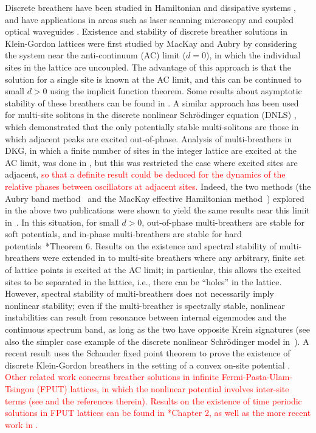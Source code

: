 \documentclass[12pt,reqno]{amsart}
\theoremstyle{definition}
\newcommand{\revised}[1]{ \textcolor{red}{#1} }
\begin{document}
Discrete breathers have been studied in Hamiltonian \cite{Flach1998} and dissipative systems \cite{Flach2008a}, and have applications in areas such as laser scanning microscopy and coupled optical waveguides \cites{Flach2008,LEDERER20081}. Existence and stability of discrete breather solutions in Klein-Gordon lattices were first studied by MacKay and Aubry \cites{MacKay1994,Aubry1997} by considering the system near the anti-continuum (AC) limit ($d=0$), in which the individual sites in the lattice are uncoupled. The advantage of this approach is that the solution for a single site is known at the AC limit, and this can be continued to small $d>0$ using the implicit function theorem. Some results about asymptotic stability of these breathers can be found in \cite{Bambusi2013}. A similar approach has been used for multi-site solitons in the discrete nonlinear Schr\"odinger equation (DNLS) \cites{Pelinovsky2005,KALOSAKAS200644}, which demonstrated that the only 
potentially stable multi-solitons are those in which adjacent peaks are excited out-of-phase. Analysis of multi-breathers in DKG, in which a finite number of sites in the integer lattice are excited at the AC limit, was done in \cites{Archilla2003,Koukouloyannis2009}, but this was restricted the case where excited sites are adjacent,
\revised{
so that a definite result could be deduced for the dynamics of the relative phases between oscillators at adjacent sites.
}
Indeed, the two methods (the Aubry band method~\cite{Aubry1997} and the MacKay
effective Hamiltonian method~\cite{sepulchre}) explored in the above two publications
were shown to yield the same results near this limit 
in~\cite{doi:10.1142/S0218127411029690}.
In this situation, for small $d>0$, out-of-phase multi-breathers are stable for soft potentials, and in-phase multi-breathers are stable for hard potentials~\cite{Archilla2003}*{Theorem 6}. Results on the existence and spectral stability of multi-breathers were extended in \cite{Pelinovsky2012} to multi-site breathers where any arbitrary, finite set of lattice points is excited at the AC limit; in particular, this allows the excited sites to be separated in the lattice, i.e., there can be ``holes'' in the lattice. However, spectral stability of multi-breathers does not necessarily imply nonlinear stability; even if the multi-breather is spectrally stable, nonlinear instabilities can result from resonance between internal eigenmodes and the continuous spectrum band, as long as the two have opposite Krein signatures \cite{cuevas-maraver2016}
(see also the simpler case example of the discrete
nonlinear Schr{\"o}dinger model in~\cite{PhysRevLett.114.214101}). A recent result uses the Schauder fixed point theorem to prove the existence of discrete Klein-Gordon breathers in the setting of a convex on-site potential \cite{hennig2021}. 
\revised{
Other related work concerns breather solutions in infinite Fermi-Pasta-Ulam-Tsingou (FPUT) lattices, in which the nonlinear potential involves inter-site terms (see \cite{FPUbook} and the references therein). Results on the existence of time periodic solutions in FPUT lattices can be found in \cite{FPUbook}*{Chapter 2}, as well as the more recent work in \cites{Arioli2019,yoshimura2021}.
}
\end{document}
